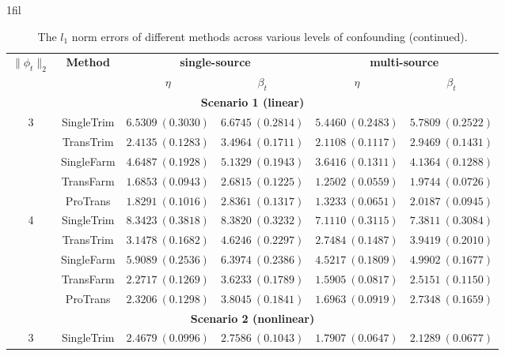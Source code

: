 \documentclass[12pt]{article}
\makeatletter
\newcommand*{\centerfloat}{%
  \parindent \z@
  \leftskip \z@ \@plus 1fil \@minus \marginparwidth
  \rightskip \leftskip
  \parfillskip \z@skip}
\makeatother
\begin{document}
\begin{table}[!ht]
\renewcommand{\arraystretch}{0.6}
\footnotesize
\centerfloat
\caption{The $l_1$ norm errors of different methods across various levels of confounding (continued).}
\label{table:l1_confounding_continued}
\begin{tabular}{cccccc}
        \toprule
        \multirow{2}{*}{\textbf{$\|\phi_t\|_2$}} & \multirow{2}{*}{\textbf{Method}} & \multicolumn{2}{c}{\textbf{single-source}} & \multicolumn{2}{c}{\textbf{multi-source}}\\
        \cmidrule(lr){3-4} \cmidrule(lr){5-6} 
        & & $\eta$ & $\beta_{t}$ & $\eta$& $\beta_{t}$ \\
        \midrule
        \multicolumn{6}{c}{\textbf{Scenario 1 (linear)}}\\
        \hline
       \multirow{5}{*}{3}
& SingleTrim  & $6.5309\ (0.3030)$ & $6.6745\ (0.2814)$ & $5.4460\ (0.2483)$ & $5.7809\ (0.2522)$ \\
& TransTrim   & $2.4135\ (0.1283)$ & $3.4964\ (0.1711)$ & $2.1108\ (0.1117)$ & $2.9469\ (0.1431)$ \\
& SingleFarm  & $4.6487\ (0.1928)$ & $5.1329\ (0.1943)$ & $3.6416\ (0.1311)$ & $4.1364\ (0.1288)$ \\
& TransFarm   & $\bm{1.6853}\ (0.0943)$ & $\bm{2.6815}\ (0.1225)$ & $\bm{1.2502}\ (0.0559)$ & $\bm{1.9744}\ (0.0726)$ \\
& ProTrans    & $1.8291\ (0.1016)$ & $2.8361\ (0.1317)$ & $1.3233\ (0.0651)$ & $2.0187\ (0.0945)$ \\
\hline
\multirow{5}{*}{4}
& SingleTrim  & $8.3423\ (0.3818)$ & $8.3820\ (0.3232)$ & $7.1110\ (0.3115)$ & $7.3811\ (0.3084)$ \\
& TransTrim   & $3.1478\ (0.1682)$ & $4.6246\ (0.2297)$ & $2.7484\ (0.1487)$ & $3.9419\ (0.2010)$ \\
& SingleFarm  & $5.9089\ (0.2536)$ & $6.3974\ (0.2386)$ & $4.5217\ (0.1809)$ & $4.9902\ (0.1677)$ \\
& TransFarm   & $\bm{2.2717}\ (0.1269)$ & $\bm{3.6233}\ (0.1789)$ & $\bm{1.5905}\ (0.0817)$ & $\bm{2.5151}\ (0.1150)$ \\
& ProTrans    & $2.3206\ (0.1298)$ & $3.8045\ (0.1841)$ & $1.6963\ (0.0919)$ & $2.7348\ (0.1659)$ \\
        \hline
         \multicolumn{6}{c}{\textbf{Scenario 2 (nonlinear)}}\\
         \hline
        \multirow{5}{*}{3}
& SingleTrim  & $2.4679\ (0.0996)$ & $2.7586\ (0.1043)$ & $1.7907\ (0.0647)$ & $2.1289\ (0.0677)$ \\

\end{tabular}
\end{table}
\end{document}
